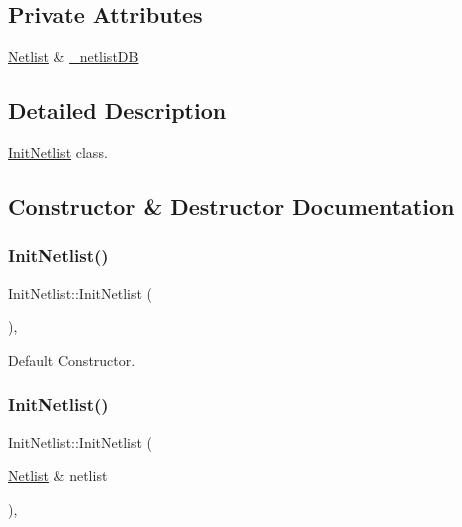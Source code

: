 \subsection*{Private Attributes}
\begin{DoxyCompactItemize}
\item 
\hyperlink{classNetlist}{Netlist} \& \hyperlink{classInitNetlist_af6a6b4238c1ecfeebfa3344426647743}{\+\_\+netlist\+DB}
\end{DoxyCompactItemize}


\subsection{Detailed Description}
\hyperlink{classInitNetlist}{Init\+Netlist} class. 

\subsection{Constructor \& Destructor Documentation}
\mbox{\label{classInitNetlist_a9def85cc1861a8a74494d9fd494acdeb}} 
\subsubsection{\texorpdfstring{Init\+Netlist()}{InitNetlist()}\hspace{0.1cm}{\footnotesize\ttfamily [1/2]}}
{\footnotesize\ttfamily Init\+Netlist\+::\+Init\+Netlist (\begin{DoxyParamCaption}{ }\end{DoxyParamCaption})\hspace{0.3cm}{\ttfamily [explicit]}, {\ttfamily [default]}}



Default Constructor. 

\mbox{\label{classInitNetlist_a330ee469b31e43357171f5943dad6387}} 
\subsubsection{\texorpdfstring{Init\+Netlist()}{InitNetlist()}\hspace{0.1cm}{\footnotesize\ttfamily [2/2]}}
{\footnotesize\ttfamily Init\+Netlist\+::\+Init\+Netlist (\begin{DoxyParamCaption}\item[{\hyperlink{classNetlist}{Netlist} \&}]{netlist }\end{DoxyParamCaption})\hspace{0.3cm}{\ttfamily [inline]}, {\ttfamily [explicit]}}



